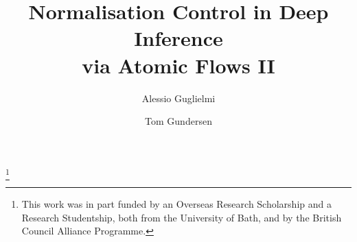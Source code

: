 \documentclass[a4paper]{amsart}
\newif\iflmcs\lmcsfalse %
\theoremstyle{remark}
\theoremstyle{definition}
\begin{document}
\title[Normalisation Control in Deep Inference   via Atomic Flows II]
      {Normalisation Control in Deep Inference\\ via Atomic Flows II}

\author{Alessio Guglielmi}

\author{Tom Gundersen}
\iflmcs\address{University of Bath, Bath BA2 7AY, UK}\fi

\thanks{This work was in part funded by an Overseas Research Scholarship and a Research Studentship, both from the University of Bath, and by the British Council Alliance Programme.}




\maketitle

\newcommand{\ot}{\mathbin\shortleftarrow}
\newcommand{\fff}{\mathsf f}
\newcommand{\ttt}{\mathsf t}
\newcommand{\ai}{\mathsf{ai}}
\newcommand{\aw}{\mathsf{aw}}
\newcommand{\ac}{\mathsf{ac}}
\newcommand{\aid}{{\ai{\downarrow}}}
\newcommand{\awd}{{\aw{\downarrow}}}
\newcommand{\acd}{{\ac{\downarrow}}}
\newcommand{\aiu}{{\ai{\uparrow}}}
\newcommand{\awu}{{\aw{\uparrow}}}
\newcommand{\acu}{{\ac{\uparrow}}}
\newcommand{\swi}{\mathsf{s}}
\newcommand{\med}{\mathsf{m}}
\newcommand{\sus}{\mathsf{ss}}
\newcommand{\said}{\mathsf{s}\aid}
\newcommand{\contr}{\mathsf{c}}
\newcommand{\cod}{{\contr{\downarrow}}}
\newcommand{\cou}{{\contr{\uparrow}}}
\newcommand{\SKS}{\mathsf{SKS}}
\newcommand{\ppl  }{{\mathchoice{\scriptstyle+}
                                {\scriptstyle+}
                                {\scriptstyle+}
                                {\scriptscriptstyle+}}}
\newcommand{\pmi  }{{\mathchoice{\scriptstyle-}
                                {\scriptstyle-}
                                {\scriptstyle-}
                                {\scriptscriptstyle-}}}
\end{document}
